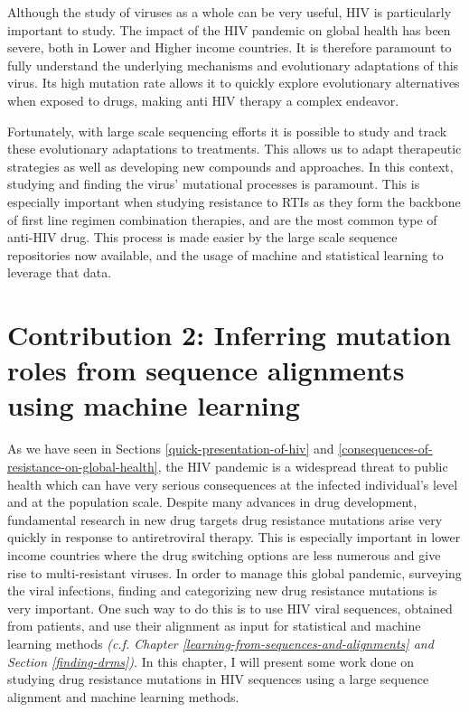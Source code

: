 \documentclass[
  11pt,
  twoside,
  BCOR=10mm,
  listof=totoc]{scrbook}
\begin{document}
Although the study of viruses as a whole can be very useful, HIV is particularly important to study. The impact of the HIV pandemic on global health has been severe, both in Lower and Higher income countries. It is therefore paramount to fully understand the underlying mechanisms and evolutionary adaptations of this virus. Its high mutation rate allows it to quickly explore evolutionary alternatives when exposed to drugs, making anti HIV therapy a complex endeavor.

Fortunately, with large scale sequencing efforts it is possible to study and track these evolutionary adaptations to treatments. This allows us to adapt therapeutic strategies as well as developing new compounds and approaches. In this context, studying and finding the virus' mutational processes is paramount. This is especially important when studying resistance to RTIs as they form the backbone of first line regimen combination therapies, and are the most common type of anti-HIV drug. This process is made easier by the large scale sequence repositories now available, and the usage of machine and statistical learning to leverage that data.


\hypertarget{HIV-paper}{%
\chapter{Contribution 2: Inferring mutation roles from sequence alignments using machine learning}\label{HIV-paper}}

As we have seen in Sections \ref{quick-presentation-of-hiv} and \ref{consequences-of-resistance-on-global-health}, the HIV pandemic is a widespread threat to public health which can have very serious consequences at the infected individual's level and at the population scale. Despite many advances in drug development, fundamental research in new drug targets drug resistance mutations arise very quickly in response to antiretroviral therapy. This is especially important in lower income countries where the drug switching options are less numerous and give rise to multi-resistant viruses. In order to manage this global pandemic, surveying the viral infections, finding and categorizing new drug resistance mutations is very important. One such way to do this is to use HIV viral sequences, obtained from patients, and use their alignment as input for statistical and machine learning methods \emph{(c.f. Chapter \ref{learning-from-sequences-and-alignments} and Section \ref{finding-drms})}. In this chapter, I will present some work done on studying drug resistance mutations in HIV sequences using a large sequence alignment and machine learning methods.
\end{document}
